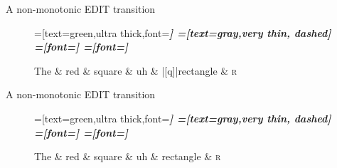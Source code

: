 \documentclass{lecture}
\begin{document}
\begin{plain}{A non-monotonic EDIT transition}

\begin{figure}
    \centering
    \begin{dependency}[theme=simple]
    =[text=green,ultra thick,font=\bfseries\itshape]
    =[text=gray,very thin, dashed]
    =[font=\bfseries\itshape]
    =[font=\itshape]
    \begin{deptext}[column sep=.075cm, row sep=.1ex]
        The \& red \& square \& uh \& |[q]|rectangle \&  \textsc{r} \\
    \end{deptext}
\end{dependency}
\end{figure}
\end{plain}

\begin{plain}{A non-monotonic EDIT transition}

\begin{figure}
    \centering
    \begin{dependency}[theme=simple]
    =[text=green,ultra thick,font=\bfseries\itshape]
    =[text=gray,very thin, dashed]
    =[font=\bfseries\itshape]
    =[font=\itshape]
    \begin{deptext}[column sep=.075cm, row sep=.1ex]
        The \& red \& square \& uh \& rectangle \&  \textsc{r} \\
    \end{deptext}
\end{dependency}
\end{figure}
\end{plain}
\end{document}
